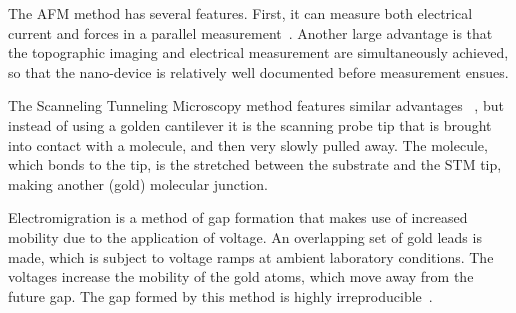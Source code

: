 The AFM method has several features. First, it can measure both electrical current and forces in a parallel measurement~\cite{nef}. Another large advantage is that the topographic imaging and electrical measurement are simultaneously achieved, so that the nano-device is relatively well documented before measurement ensues.

The Scanneling Tunneling Microscopy method features similar advantages ~\cite{Joachim2000}, but instead of using a golden cantilever it is the scanning probe tip that is brought into contact with a molecule, and then very slowly pulled away. The molecule, which bonds to the tip, is the stretched between the substrate and the STM tip, making another (gold) molecular junction.

Electromigration is a method of gap formation that makes use of increased mobility due to the application of voltage. An overlapping set of gold leads is made, which is subject to voltage ramps at ambient laboratory conditions. The voltages increase the mobility of the gold atoms, which move away from the future gap. The gap formed by this method is highly irreproducible~\cite{electromigration}.

